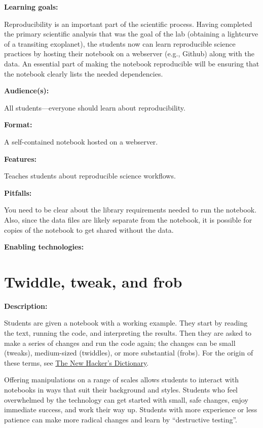 \documentclass[]{book}
\begin{document}
\textbf{Learning goals:}

Reproducibility is an important part of the scientific process. Having
completed the primary scientific analysis that was the goal of the lab
(obtaining a lightcurve of a transiting exoplanet), the students now can
learn reproducible science practices by hosting their notebook on a
webserver (e.g., Github) along with the data. An essential part of
making the notebook reproducible will be ensuring that the notebook
clearly lists the needed dependencies.

\textbf{Audience(s):}

All students---everyone should learn about reproducibility.

\textbf{Format:}

A self-contained notebook hosted on a webserver.

\textbf{Features:}

Teaches students about reproducible science workflows.

\textbf{Pitfalls:}

You need to be clear about the library requirements needed to run the
notebook. Also, since the data files are likely separate from the
notebook, it is possible for copies of the notebook to get shared
without the data.

\textbf{Enabling technologies:}

\section{Twiddle, tweak, and frob}\label{twiddle-tweak-and-frob}

\textbf{Description:}

Students are given a notebook with a working example. They start by
reading the text, running the code, and interpreting the results. Then
they are asked to make a series of changes and run the code again; the
changes can be small (tweaks), medium-sized (twiddles), or more
substantial (frobs). For the origin of these terms, see
\href{https://books.google.com/books?id=g80P_4v4QbIC\&pg=PA206\&lpg=PA206\&dq=twiddle+tweak+frob\&source=bl\&ots=6pcpsqgvM5\&sig=FGifP8qpYhhOylnKKLtTuElIjUI\&hl=en\&sa=X\&ved=2ahUKEwjP57yulfreAhXFjVkKHRqNBTsQ6AEwBXoECAoQAQ\#v=onepage\&q=twiddle\%20tweak\%20frob\&f=false}{The
New Hacker's Dictionary}.

Offering manipulations on a range of scales allows students to interact
with notebooks in ways that suit their background and styles. Students
who feel overwhelmed by the technology can get started with small, safe
changes, enjoy immediate success, and work their way up. Students with
more experience or less patience can make more radical changes and learn
by ``destructive testing''.
\end{document}
